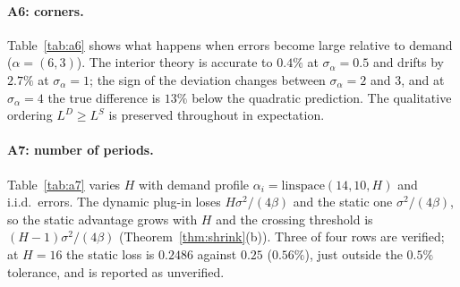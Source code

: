 \documentclass[11pt]{article}
\theoremstyle{definition}
\theoremstyle{remark}
\begin{document}
\begin{expsec}
\paragraph{A6: corners.} Table~\ref{tab:a6} shows what happens when errors become large relative to demand ($\alpha=(6,3)$). The interior theory is accurate to $0.4\%$ at $\sigma_\alpha=0.5$ and drifts by $2.7\%$ at $\sigma_\alpha=1$; the sign of the deviation changes between $\sigma_\alpha=2$ and $3$, and at $\sigma_\alpha=4$ the true difference is $13\%$ below the quadratic prediction. The qualitative ordering $L^D\ge L^S$ is preserved throughout in expectation.
\begin{table}[t]\centering\small
\caption{A6. $E[L^D-L^S]$ under clipped true revenue against the Lemma-1 prediction $\sigma_\alpha^2/(4\beta)$, $\alpha=(6,3)$.}\label{tab:a6}\end{table}
\paragraph{A7: number of periods.} Table~\ref{tab:a7} varies $H$ with demand profile $\alpha_i=\mathrm{linspace}(14,10,H)$ and i.i.d.\ errors. The dynamic plug-in loses $H\sigma^2/(4\beta)$ and the static one $\sigma^2/(4\beta)$, so the static advantage grows with $H$ and the crossing threshold is $(H-1)\sigma^2/(4\beta)$ (Theorem~\ref{thm:shrink}(b)). Three of four rows are verified; at $H=16$ the static loss is $0.2486$ against $0.25$ ($0.56\%$), just outside the $0.5\%$ tolerance, and is reported as unverified.
\begin{table}[t]\centering\small
\caption{A7. Number of periods, $\sigma=1$, $\beta=1$. ``dynamic wins'' is $G$ against the threshold.}\label{tab:a7}\end{table}


\end{expsec}
\end{document}
